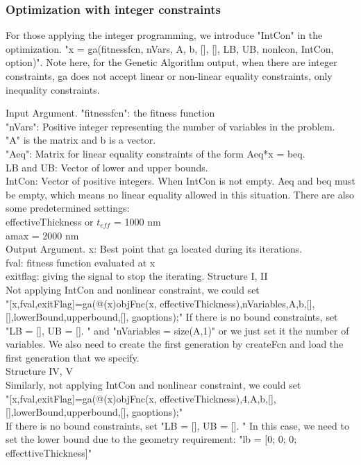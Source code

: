 \documentclass[12pt]{article}
\numberwithin{equation}{section}
\numberwithin{equation}{section}
\begin{document}
\subsubsection{Optimization with integer constraints}
For those applying the integer programming, we introduce "IntCon" in the optimization. 
"x = ga(fitnessfcn, nVars, A, b, [], [], LB, UB, nonlcon, IntCon, option)". Note here, for the Genetic Algorithm output, when there are integer constraints, ga does not accept linear or non-linear equality constraints, only inequality constraints. 
\begin{outline}[enumerate]
\1 Input Argument. 
	"fitnessfcn": the fitness function \\
	"nVars": Positive integer representing the number of variables in the problem. \\
	"A" is the matrix and b is a vector. \\
	"Aeq": Matrix for linear equality constraints of the form Aeq*x = beq. \\
	LB and UB: Vector of lower and upper bounds.  \\
	IntCon: Vector of positive integers. When IntCon is not empty. Aeq and beq must be empty, which 	means no linear equality allowed in this situation. 
	There are also some predetermined settings: \\
	effectiveThickness or $t_{eff}$ = 1000 nm \\
	amax = 2000 nm\\	
\1  Output Argument.
	x: Best point that ga located during its iterations. \\
	fval: fitness function evaluated at x \\
	exitflag: giving the signal to stop the iterating. 
\1 Structure I, II \\
	Not applying IntCon and nonlinear constraint, we could set \\
	"[x,fval,exitFlag]=ga(@(x)objFnc(x, effectiveThickness),nVariables,A,b,[],[],lowerBound,upperbound,[], gaoptions);" If there is no bound constraints, set "LB = [], UB = []. " and "nVariables = size(A,1)" or we just set it the number of variables. We also need to create the first generation by createFcn and load the first generation that we specify. \\
\1 Structure IV, V \\	
Similarly, not applying IntCon and nonlinear constraint, we could set \\
	"[x,fval,exitFlag]=ga(@(x)objFnc(x, effectiveThickness),4,A,b,[],[],lowerBound,upperbound,[], gaoptions);" \\
	If there is no bound constraints, set "LB = [], UB = []. " In this case, we need to set the lower bound due to the geometry requirement: "lb = [0; 0; 0; effecttiveThickness]"\\
\end{outline}
\end{document}
